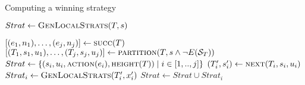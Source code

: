 

\begin{algorithm}
   \caption{Computing a winning strategy}\label{alg:strat}
   \begin{algorithmic}[1]
            \State $Strat \gets \Call{GenLocalStrats}{T,s}$
            \State {}
        \EndFunction
        \Statex

            \State $[(e_1, n_1),\ldots,(e_j, n_j)] \gets \Call{succ}{T}$
            \State $[(T_1,s_1,u_1),\ldots,(T_j, s_j, u_j)] \gets \textsc{partition}(T, s \land \neg E(\mathcal{S}_T))$
            \State $Strat \gets \{(s_i, u_i, \Call{action}{e_i}, \Call{height}{T}) \mid i \in[1,..,j]\}$\label{alg:strat:strati}
            \label{alg:strat:for}
                \State $(T_i', s_i') \gets \textsc{next}(T_i, s_i, u_i)$\label{alg:strat:next}
                \State $Strat_i \gets \Call{GenLocalStrats}{T_i', x_i'}$\label{alg:strat:rec}
                \State $Strat \gets Strat \cup Strat_i$
            \EndFor\label{alg:strat:endfor}
            \State {} \label{alg:strat:return}
        \EndFunction
    \end{algorithmic}
\end{algorithm}


